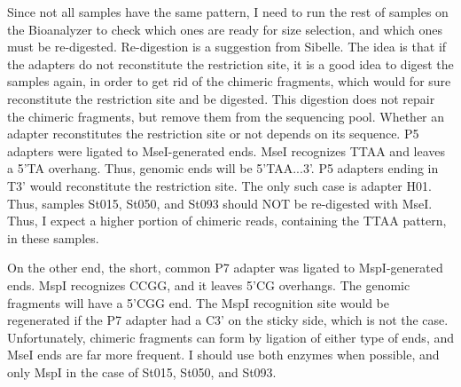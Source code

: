 \documentclass[a4paper,12pt,twosided]{article}
\begin{document}
Since not all samples have the same pattern, I need to run the rest of samples on the Bioanalyzer to check which ones are ready for size selection, and which ones must be re-digested. Re-digestion is a suggestion from Sibelle. The idea is that if the adapters do not reconstitute the restriction site, it is a good idea to digest the samples again, in order to get rid of the chimeric fragments, which would for sure reconstitute the restriction site and be digested. This digestion does not repair the chimeric fragments, but remove them from the sequencing pool. Whether an adapter reconstitutes the restriction site or not depends on its sequence. P5 adapters were ligated to MseI-generated ends. MseI recognizes \textsf{TTAA} and leaves a 5'\textsf{TA} overhang. Thus, genomic ends will be 5'\textsf{TAA}...3'. P5 adapters ending in \textsf{T}3' would reconstitute the restriction site. The only such case is adapter H01. Thus, samples St015, St050, and St093 should NOT be re-digested with MseI. Thus, I expect a higher portion of chimeric reads, containing the \textsf{TTAA} pattern, in these samples.

On the other end, the short, common P7 adapter was ligated to MspI-generated ends. MspI recognizes \textsf{CCGG}, and it leaves 5'\textsf{CG} overhangs. The genomic fragments will have a 5'\textsf{CGG} end. The MspI recognition site would be regenerated if the P7 adapter had a \textsf{C}3' on the sticky side, which is not the case. Unfortunately, chimeric fragments can form by ligation of either type of ends, and MseI ends are far more frequent. I should use both enzymes when possible, and only MspI in the case of St015, St050, and St093.
\end{document}
